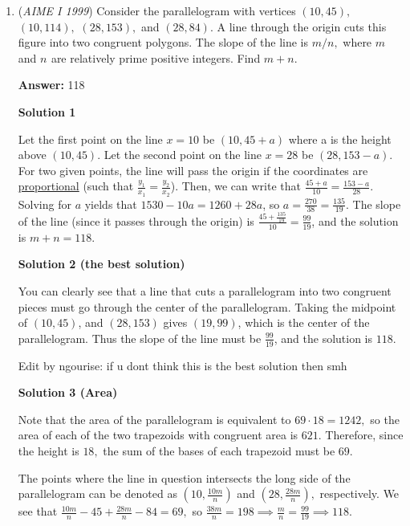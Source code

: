 \begin{enumerate}
 
-jackshi2006

 


	\item (\textit{AIME I 1999}) Consider the parallelogram with vertices $(10,45),$ $(10,114),$ $(28,153),$ and $(28,84).$  A line through the origin cuts this figure into two congruent polygons.  The slope of the line is $m/n,$ where $m_{}$ and $n_{}$ are relatively prime positive integers.  Find $m+n.$

 \textbf{Answer: }118



\textbf{Solution 1}

Let the first point on the line $x=10$ be $(10,45+a)$ where a is the height above $(10,45)$.  Let the second point on the line $x=28$ be $(28, 153-a)$. For two given points, the line will pass the origin if the coordinates are \href{https://artofproblemsolving.com/wiki/index.php?title=Proportion}{proportional} (such that $\frac{y_1}{x_1} = \frac{y_2}{x_2}$). Then, we can write that $\frac{45 + a}{10} = \frac{153 - a}{28}$. Solving for $a$ yields that $1530 - 10a = 1260 + 28a$, so $a=\frac{270}{38}=\frac{135}{19}$. The slope of the line (since it passes through the origin) is $\frac{45 + \frac{135}{19}}{10} = \frac{99}{19}$, and the solution is $m + n = \boxed{118}$.

 



\textbf{Solution 2 (the best solution)}

You can clearly see that a line that cuts a parallelogram into two congruent pieces must go through the center of the parallelogram. Taking the midpoint of $(10,45)$, and $(28,153)$ gives $(19,99)$, which is the center of the parallelogram. Thus the slope of the line must be $\frac{99}{19}$, and the solution is $\boxed{118}$.

 Edit by ngourise: if u dont think this is the best solution then smh

 



\textbf{Solution 3 (Area)}

Note that the area of the parallelogram is equivalent to $69 \cdot 18 = 1242,$ so the area of each of the two trapezoids with congruent area is $621.$ Therefore, since the height is $18,$ the sum of the bases of each trapezoid must be $69.$ 

 The points where the line in question intersects the long side of the parallelogram can be denoted as $(10, \frac{10m}{n})$ and $(28, \frac{28m}{n}),$ respectively. We see that $\frac{10m}{n} - 45 + \frac{28m}{n} - 84 = 69,$ so $\frac{38m}{n} = 198 \implies \frac{m}{n} = \frac{99}{19} \implies \boxed{118}.$


\end{enumerate}
